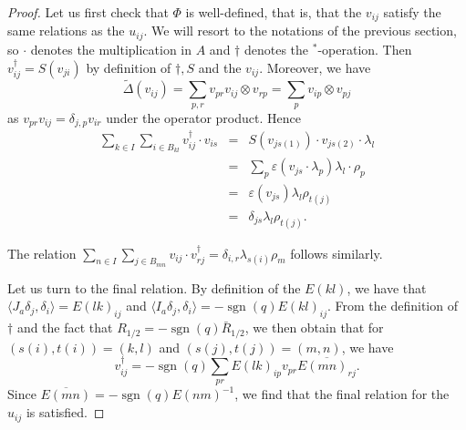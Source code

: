 \documentclass[12pt]{article}
\theoremstyle{change}
\DeclareMathOperator{\sgn}{\mathrm{sgn}}
\theoremstyle{definition}
\numberwithin{equation}{section}
\begin{document}
\begin{proof} Let us first check that $\Phi$ is well-defined, that is, that the $v_{ij}$ satisfy the same relations as the $u_{ij}$. We will resort to the notations of the previous section, so $\cdot$ denotes the multiplication in $A$ and $\dag$ denotes the $^*$-operation. Then $v_{ij}^{\dag} = S(v_{ji})$ by definition of $\dag,S$ and the $v_{ij}$. Moreover, we have \[\widetilde{\Delta}(v_{ij}) = \sum_{p,r} v_{pr}v_{ij}\otimes v_{rp} = \sum_p  v_{ip}\otimes v_{pj}\] as $v_{pr}v_{ij} = \delta_{j,p}v_{ir}$ under the operator product. Hence \begin{eqnarray*} \sum_{k\in I}\sum_{i\in B_{kl}} v_{ij}^{\dag}\cdot v_{is} &=& S(v_{js(1)})\cdot v_{js(2)}\cdot\lambda_l \\ &=& \sum_p \varepsilon(v_{js}\cdot \lambda_p)\lambda_l\cdot\rho_p \\ &=& \varepsilon(v_{js}) \lambda_l\rho_{t(j)} \\ &=& \delta_{js}\lambda_l\rho_{t(j)}.\end{eqnarray*}

The relation $\sum_{n\in I}\sum_{j\in B_{mn}} v_{ij}\cdot v_{rj}^{\dag} = \delta_{i,r}\lambda_{s(i)}\rho_m$ follows similarly.

Let us turn to the final relation. By definition of the $E(kl)$, we have that $\langle J_a\delta_j,\delta_i\rangle =E(lk)_{ij}$ and $\langle I_a\delta_j,\delta_i\rangle = -\sgn(q)E(kl)_{ij}$. From the definition of $\dag$ and the fact that $R_{1/2} = -\sgn(q)\bar{R}_{1/2}$, we then obtain that for $(s(i),t(i))=(k,l)$ and $(s(j),t(j))=(m,n)$, we have \[v_{ij}^{\dag} = -\sgn(q)\sum_{pr} E(lk)_{ip} v_{pr} \overline{E(mn)_{rj}}.\] Since $\overline{E(mn)} = -\sgn(q)E(nm)^{-1}$, we find that the final relation for the $u_{ij}$ is satisfied.

\end{proof}
\end{document}

